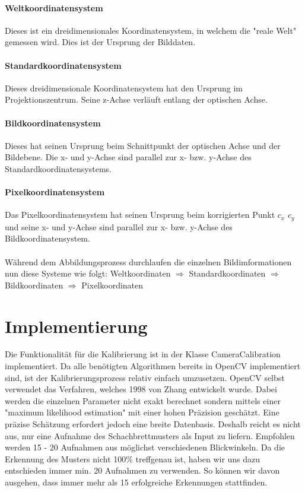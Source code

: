\paragraph{Weltkoordinatensystem } Dieses ist ein dreidimensionales Koordinatensystem, in welchem die "reale Welt" gemessen wird. Dies ist der Ursprung der Bilddaten.

\paragraph{Standardkoordinatensystem } Dieses dreidimensionale Koordinatensystem hat den Ursprung im Projektionszentrum. Seine z-Achse verläuft entlang der optischen Achse.

\paragraph{Bildkoordinatensystem } Dieses hat seinen Ursprung beim Schnittpunkt der optischen Achse und der Bildebene. Die x- und y-Achse sind parallel zur x- bzw. y-Achse des Standardkoordinatensystems.

\paragraph{Pixelkoordinatensystem } Das Pixelkoordinatensystem hat seinen Ursprung beim korrigierten Punkt $c_x$ \/ $c_y$  und seine x- und y-Achse sind parallel zur x- bzw. y-Achse des Bildkoordinatensystem.

\paragraph{} Während dem Abbildungsprozess durchlaufen die einzelnen Bildimformationen nun diese Systeme wie folgt: Weltkoordinaten $\Rightarrow$ Standardkoordinaten $\Rightarrow$ Bildkoordinaten $\Rightarrow$ Pixelkoordinaten

\section{Implementierung}
Die Funktionalität für die Kalibrierung ist in der Klasse CameraCalibration implementiert. Da alle benötigten Algorithmen bereits in OpenCV implementiert sind, ist der Kalibrierungsprozess relativ einfach umzusetzen. OpenCV selbst verwendet das Verfahren, welches 1998 von Zhang \cite{zhang} entwickelt wurde. Dabei werden die einzelnen Parameter nicht exakt berechnet sondern mittels einer "maximum likelihood estimation" mit einer hohen Präzision geschätzt. Eine präzise Schätzung erfordert jedoch eine breite Datenbasis. Deshalb reicht es nicht aus, nur eine Aufnahme des Schachbrettmusters als Input zu liefern. Empfohlen werden 15 - 20 Aufnahmen aus möglichst verschiedenen Blickwinkeln. Da die Erkennung des Musters nicht 100\% treffgenau ist, haben wir uns dazu entschieden immer min. 20 Aufnahmen zu verwenden. So können wir davon ausgehen, dass immer mehr als 15 erfolgreiche Erkennungen stattfinden.

